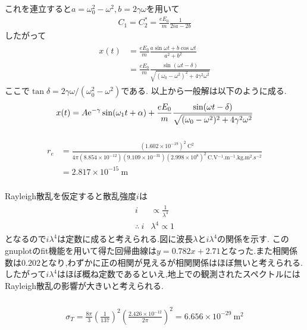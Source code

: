これを連立すると$a=\omega_0^2-\omega^2,b=2\gamma\omega$を用いて
\begin{align}
  C_1=C_2^*=\frac{eE_0}{m}\frac{1}{2ia-2b}
\end{align}
したがって
\begin{align}
  \begin{split}
    x(t)&=\frac{eE_0}{m}\frac{a\sin\omega t+b\cos\omega t}{a^2+b^2}\\
    &=\frac{eE_0}{m}\frac{\sin(\omega t-\delta)}{\sqrt{(\omega_0-\omega^2)^2+4\gamma^2\omega^2}}
  \end{split}
\end{align}
ここで$\tan\delta=2\gamma\omega/(\omega_0^2-\omega^2)$である.
以上から一般解は以下のように成る.
\begin{align}
  x(t)=A{\rm e}^{-\gamma}\sin(\omega_1 t+\alpha)+\frac{eE_0}{m}\frac{\sin(\omega t-\delta)}{\sqrt{(\omega_0-\omega^2)^2+4\gamma^2\omega^2}}
\end{align}
\subsubsection{}
\begin{align*}
  r_e&=\frac{(1.602\times10^{-19})^2\ \si{\coulomb^2}}{4\pi(8.854\times10^{-12})(9.109\times10^{-31})(2.998\times10^8)^2\ \si{\coulomb.\volt^{-1}.\metre^{-1}.\kilo\gram.\metre^2.\second^{-2}}}\\
  &=2.817\times10^{-15}\ \si{\metre}
\end{align*}
\subsubsection{}
Rayleigh散乱を仮定すると散乱強度$i$は
\begin{align}
  \begin{split}
    i&\propto\frac{1}{\lambda^4}\\
    \therefore\ i&\lambda^4\propto 1
  \end{split}
\end{align}
となるので$i\lambda^4$は定数に成ると考えられる.図に波長$\lambda$と$i\lambda^4$の関係を示す.
このgnuplotのfit機能を用いて得た回帰曲線は$y=0.782x+2.71$となった.また相関係数は$0.202$となり,わずかに正の相関が見えるが相関関係はほぼ無いと考えられる.
したがって$i\lambda^4$はほぼ概ね定数であるといえ,地上での観測されたスペクトルにはRayleigh散乱の影響が大きいと考えられる.
\subsubsection{}
\begin{align}
  \sigma_T=\frac{8\pi}{3}\left(\frac{1}{137}\right)^2\left(\frac{2.426\times10^{-12}}{2\pi}\right)^2=6.656\times10^{-29}\ \si{\metre^2}
\end{align}
